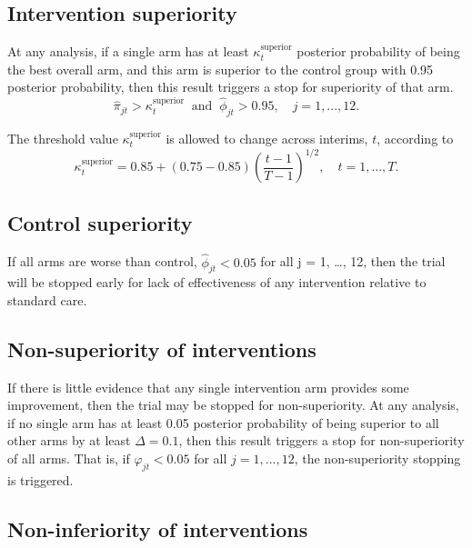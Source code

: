 \documentclass[
  bibliography=totoc]{scrreprt}
\begin{document}
\hypertarget{intervention-superiority}{%
\subsection{Intervention superiority}\label{intervention-superiority}}

At any analysis, if a single arm has at least \(\kappa_t^{\text{superior}}\) posterior probability of being the best overall arm, and this arm is superior to the control group with 0.95 posterior probability, then this result triggers a stop for superiority of that arm.
\[
\hat\pi_{jt}>\kappa_t^{\text{superior}}\ \text{ and }\ \hat\phi_{jt}>0.95,\quad j=1,...,12.
\]

The threshold value \(\kappa_t^{\text{superior}}\) is allowed to change across interims, \(t\), according to
\[
\kappa_t^{\text{superior}} = 0.85 + (0.75 - 0.85)\left(\frac{t-1}{T-1}\right)^{1/2},\quad t = 1,...,T.
\]

\hypertarget{control-superiority}{%
\subsection{Control superiority}\label{control-superiority}}

If all arms are worse than control, \(\hat\phi_{jt}<0.05\) for all j = 1, \ldots, 12, then the trial will be stopped early for lack of effectiveness of any intervention relative to standard care.

\hypertarget{non-superiority-of-interventions}{%
\subsection{Non-superiority of interventions}\label{non-superiority-of-interventions}}

If there is little evidence that any single intervention arm provides some improvement, then the trial may be stopped for non-superiority.
At any analysis, if no single arm has at least 0.05 posterior probability of being superior to all other arms by at least \(\Delta=0.1\), then this result triggers a stop for non-superiority of all arms.
That is, if \(\hat\varphi_{jt}<0.05\) for all \(j=1,...,12\), the non-superiority stopping is triggered.

\hypertarget{non-inferiority-of-interventions}{%
\subsection{Non-inferiority of interventions}\label{non-inferiority-of-interventions}}
\end{document}
